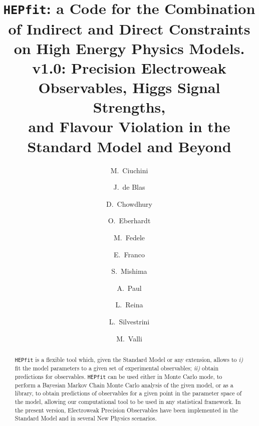 \documentclass[aps,superscriptaddress,nofootinbib,floatfix,notitlepage]{revtex4-1}
\newcommand{\HEPfit}{\texttt{HEPfit}\xspace}
\begin{document}
\title{\HEPfit: a Code for the Combination of Indirect and Direct
  Constraints\\ on High Energy Physics Models. \\
  v1.0: Precision Electroweak Observables, Higgs Signal Strengths,\\ and Flavour Violation in the
  Standard Model and Beyond
  \vspace*{0.5cm}
}

\collaboration{
\HEPfit Collaboration
}
\author{M.~Ciuchini}
\author{J.~de Blas}
\author{D.~Chowdhury}
\author{O.~Eberhardt}
\author{M.~Fedele}
\author{E.~Franco}
\author{S.~Mishima}
\author{A.~Paul}
\author{L.~Reina}
\author{L.~Silvestrini}
\author{M.~Valli}
\begin{abstract}
\HEPfit is a flexible %
tool which, given the Standard Model or any extension, allows to \textit{i)} fit the model
parameters to a given set of experimental observables;
\textit{ii)} obtain predictions for observables.
\HEPfit can be used either in Monte Carlo mode, to perform a Bayesian Markov Chain Monte Carlo
analysis of the given model, or as a library, to obtain predictions of
observables for a given point in the parameter space of the model, allowing our computational tool to be used in
any statistical framework. In the present version, Electroweak Precision Observables have been implemented
in the Standard Model and in several New Physics scenarios.


\end{abstract}
 
\end{document}
